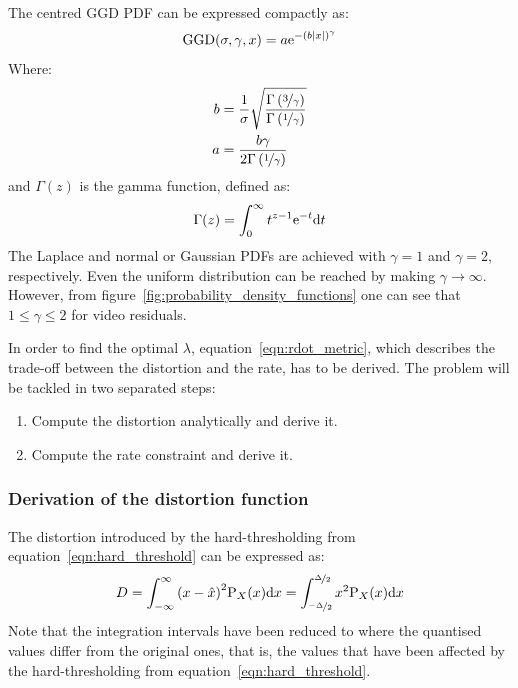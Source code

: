 \documentclass[11pt,a4paper,openright,twoside]{book}
\numberwithin{equation}{section} %
\begin{document}
The centred \ac{GGD} \ac{PDF} can be expressed compactly as:
\begin{equation}
	\text{GGD}(\sigma,\gamma,x)=
	a\text{e}^{-{\left(b\vert x \vert\right)}^\gamma}
	\label{eqn:ggd}
\end{equation}
Where:
\begin{align}
	b &= \frac{1}{\sigma}\sqrt{
	\frac{\Gamma\left(\nicefrac{3}{\gamma}\right)}
	{\Gamma \left(\nicefrac{1}{\gamma}\right)}} \\
	a &= \frac{b\gamma}{2\Gamma \left(\nicefrac{1}{\gamma}\right)}
\end{align}
and $\Gamma(z)$ is the gamma function, defined as:
\begin{equation}
	\Gamma(z) = \int_0^\infty t^{z-1}\text{e}^{-t}\text{d} t
\end{equation}
The Laplace and normal or Gaussian \acp{PDF} are achieved with
$\gamma=1$ and $\gamma=2$, respectively.
Even the uniform distribution can be reached by making $\gamma\to\infty$.
However, from figure~\ref{fig:probability_density_functions} one can see
that $1\le\gamma\le2$ for video residuals.

In order to find the optimal $\lambda$, equation~\ref{eqn:rdot_metric},
which describes the trade-off between the distortion and the rate, has
to be derived.
The problem will be tackled in two separated steps:
\begin{enumerate}
	\item Compute the distortion analytically and derive it.
	\item Compute the rate constraint and derive it.
\end{enumerate}

\subsubsection{Derivation of the distortion function}
\label{ssub:derivation_of_the_distortion_function}

The distortion introduced by the hard-thresholding from
equation~\ref{eqn:hard_threshold} can be expressed as:
\begin{equation}
	D
	= \int_{-\infty}^{\infty} {(x - \hat x)}^2 \text{P}_X (x)\text{d} x
	= \int_{\nicefrac{-\Delta}{2}}^{\nicefrac{\Delta}{2}}
	\label{eqn:int_distortion}
	x^2\text{P}_X (x) \text{d} x
\end{equation}
Note that the integration intervals have been reduced to where the
quantised values differ from the original ones, that is, the values that
have been affected by the hard-thresholding from
equation~\ref{eqn:hard_threshold}.
\end{document}
